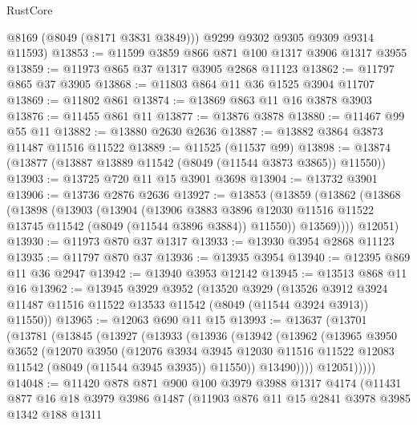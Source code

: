 \begin{lexlean}{RustCore}
\begin{coremodule}
        @8169
        (@8049 (@8171 @3831 @3849)))
      @9299
      @9302
      @9305
      @9309
      @9314
      @11593)
@13853 := @11599 @3859 @866 @871 @100 @1317 @3906 @1317 @3955
@13859 := @11973 @865 @37 @1317 @3905 @2868 @11123
@13862 := @11797 @865 @37 @3905
@13868 := @11803 @864 @11 @36 @1525 @3904 @11707
@13869 := @11802 @861
@13874 := @13869 @863 @11 @16 @3878 @3903
@13876 := @11455 @861 @11
@13877 := @13876 @3878
@13880 := @11467 @99 @55 @11
@13882 := @13880 @2630 @2636
@13887 := @13882 @3864 @3873 @11487 @11516 @11522
@13889 := @11525 (@11537 @99)
@13898 := @13874 (@13877 (@13887 @13889 @11542 (@8049 (@11544 @3873 @3865)) @11550))
@13903 := @13725 @720 @11 @15 @3901 @3698
@13904 := @13732 @3901
@13906 := @13736 @2876 @2636
@13927 := @13853
    (@13859
      (@13862
        (@13868
          (@13898
            (@13903
              (@13904
                (@13906
                  @3883
                  @3896
                  @12030
                  @11516
                  @11522
                  @13745
                  @11542
                  (@8049 (@11544 @3896 @3884))
                  @11550))
              @13569))))
      @12051)
@13930 := @11973 @870 @37 @1317
@13933 := @13930 @3954 @2868 @11123
@13935 := @11797 @870 @37
@13936 := @13935 @3954
@13940 := @12395 @869 @11 @36 @2947
@13942 := @13940 @3953 @12142
@13945 := @13513 @868 @11 @16
@13962 := @13945
    @3929
    @3952
    (@13520
      @3929
      (@13526 @3912 @3924 @11487 @11516 @11522 @13533 @11542 (@8049 (@11544 @3924 @3913)) @11550))
@13965 := @12063 @690 @11 @15
@13993 := @13637
    (@13701
      (@13781
        (@13845
          (@13927
            (@13933
              (@13936
                (@13942
                  (@13962
                    (@13965
                      @3950
                      @3652
                      (@12070
                        @3950
                        (@12076
                          @3934
                          @3945
                          @12030
                          @11516
                          @11522
                          @12083
                          @11542
                          (@8049 (@11544 @3945 @3935))
                          @11550))
                      @13490))))
              @12051)))))
@14048 := @11420
    @878
    @871
    @900
    @100
    @3979
    @3988
    @1317
    @4174
    (@11431
      @877
      @16
      @18
      @3979
      @3986
      @1487
      (@11903
        @876
        @11
        @15
        @2841
        @3978
        @3985
        @1342
        @188
        @1311

\end{coremodule}
\end{lexlean}
